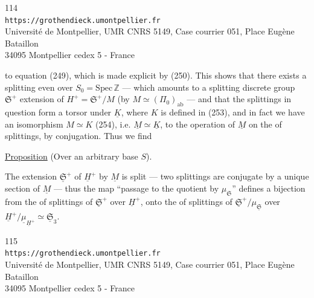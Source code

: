 
\begin{center}
\small
114\\
\texttt{https://grothendieck.umontpellier.fr}\\
Université de Montpellier, UMR CNRS 5149, Case courrier 051, Place Eugène Bataillon\\
34095 Montpellier cedex 5 - France
\end{center}


to equation (249), which is made explicit by (250).
This shows that there exists a splitting
even over $S_0=\mathrm{Spec}\,\mathbb Z$
--- which amounts to a splitting  discrete group
$\mathfrak S^+$ extension of
$H^+=\mathfrak S^+/M$
(by $M\simeq(\Pi_0)_{\mathrm{ab}}$ \unsure{)}
--- and that the splittings in question form a
torsor under $\underline K$, where $K$
is defined in (253), and in fact 
we have an isomorphism $M\simeq K$ (254), i.e.
$\underline M\simeq\underline K$, 
to the operation of $\underline M$ on the 
of splittings, by conjugation. Thus we find

\uline{Proposition} (Over an arbitrary base $S$).

The extension $\underline{\mathfrak S}^+$ of
$\underline H^+$ by $\underline M$ is split ---
two splittings are conjugate by a unique section
of $\underline M$ --- thus the map 
``passage to the quotient by $\mu_{\mathfrak S}$'' defines a
bijection from the  of splittings of
$\underline{\mathfrak S}^+$ over $\underline H^+$,
onto the  of splittings of
$\underline{\mathfrak S}^+/\mu_{\underline{\mathfrak S}}$
over $\underline H^+/\underline\mu_{\underline H^+}
\simeq\underline{\mathfrak S}_3$.


\begin{center}
\small
115\\
\texttt{https://grothendieck.umontpellier.fr}\\
Université de Montpellier, UMR CNRS 5149, Case courrier 051, Place Eugène Bataillon\\
34095 Montpellier cedex 5 - France
\end{center}


